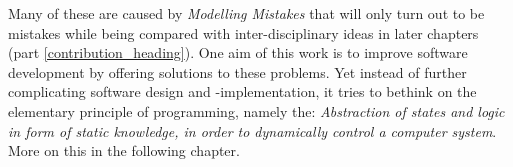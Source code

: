 Many of these are caused by \emph{Modelling Mistakes} that will only turn out
to be mistakes while being compared with inter-disciplinary ideas in later
chapters (part \ref{contribution_heading}). One aim of this work is to improve
software development by offering solutions to these problems. Yet instead of
further complicating software design and -implementation, it tries to bethink
on the elementary principle of programming, namely the: \textit{Abstraction of
states and logic in form of static knowledge, in order to dynamically control a
computer system}. More on this in the following chapter.
